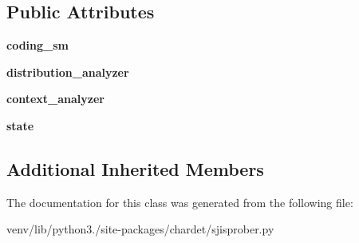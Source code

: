 \subsection*{Public Attributes}
\begin{DoxyCompactItemize}
\item 
\mbox{\label{classchardet_1_1sjisprober_1_1_s_j_i_s_prober_a5a578d260c1851fbce975f8d8e9b7f05}} 
{\bfseries coding\+\_\+sm}
\item 
\mbox{\label{classchardet_1_1sjisprober_1_1_s_j_i_s_prober_aa61a3c91e3582f6a9316da90c4755193}} 
{\bfseries distribution\+\_\+analyzer}
\item 
\mbox{\label{classchardet_1_1sjisprober_1_1_s_j_i_s_prober_a82864e8521ee8308d79e66014e85f294}} 
{\bfseries context\+\_\+analyzer}
\item 
\mbox{\label{classchardet_1_1sjisprober_1_1_s_j_i_s_prober_adb102d3c09d0141cf8c6ea801aa99d58}} 
{\bfseries state}
\end{DoxyCompactItemize}
\subsection*{Additional Inherited Members}


The documentation for this class was generated from the following file\+:\begin{DoxyCompactItemize}
\item 
venv/lib/python3./site-\/packages/chardet/sjisprober.\+py\end{DoxyCompactItemize}
